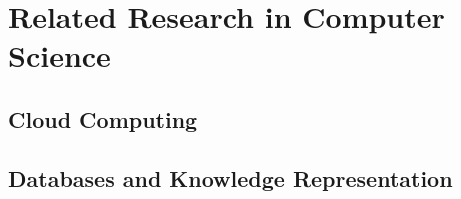 \chapter{Related Research in Computer Science}

\section{Cloud Computing}

\section{Databases and Knowledge Representation}

